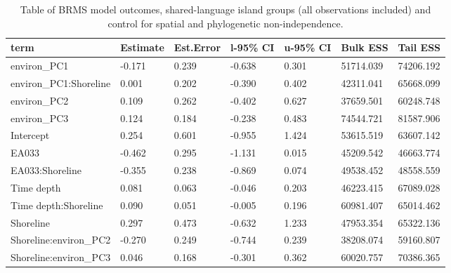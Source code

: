 \begin{table}[ht]
\centering
\begin{tabular}{p{4cm}p{1.65cm}p{1.65cm}p{1.65cm}p{1.65cm}p{1.65cm}p{1.65cm}}
  \toprule
term & Estimate & Est.Error & l-95\% CI & u-95\% CI & Bulk ESS & Tail ESS \\ 
  \midrule
environ\_PC1 & -0.171 & 0.239 & -0.638 & 0.301 & 51714.039 & 74206.192 \\ 
  environ\_PC1:Shoreline & 0.001 & 0.202 & -0.390 & 0.402 & 42311.041 & 65668.099 \\ 
  environ\_PC2 & 0.109 & 0.262 & -0.402 & 0.627 & 37659.501 & 60248.748 \\ 
  environ\_PC3 & 0.124 & 0.184 & -0.238 & 0.483 & 74544.721 & 81587.906 \\ 
  Intercept & 0.254 & 0.601 & -0.955 & 1.424 & 53615.519 & 63607.142 \\ 
  EA033 & -0.462 & 0.295 & -1.131 & 0.015 & 45209.542 & 46663.774 \\ 
  EA033:Shoreline & -0.355 & 0.238 & -0.869 & 0.074 & 49538.452 & 48558.559 \\ 
  Time depth & 0.081 & 0.063 & -0.046 & 0.203 & 46223.415 & 67089.028 \\ 
  Time depth:Shoreline & 0.090 & 0.051 & -0.005 & 0.196 & 60981.407 & 65014.462 \\ 
  Shoreline & 0.297 & 0.473 & -0.632 & 1.233 & 47953.354 & 65322.136 \\ 
  Shoreline:environ\_PC2 & -0.270 & 0.249 & -0.744 & 0.239 & 38208.074 & 59160.807 \\ 
  Shoreline:environ\_PC3 & 0.046 & 0.168 & -0.301 & 0.362 & 60020.757 & 70386.365 \\ 
   \bottomrule
\end{tabular}
\caption{Table of BRMS model outcomes, shared-language island groups (all observations included) and control for spatial and phylogenetic non-independence.} 
\label{BRMS_effects_medium_control_sp}
\end{table}

